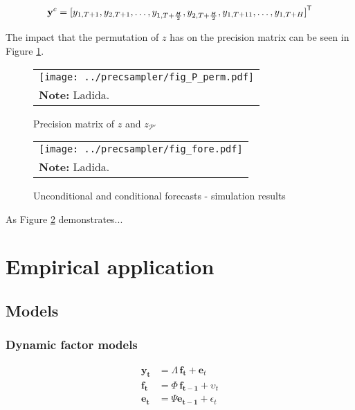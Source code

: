 \documentclass[notitlepage,a4paper,12pt]{article}
\newcommand{\transpose}[1]{{#1}^{\sf{T}}}
\begin{document}
$$\mathbf{y}^c = \transpose{[y_{1,T+1}, y_{2,T+1}, \dots, y_{1,T+\frac{H}{2}}, y_{2,T+\frac{H}{2}}, y_{1,T+11}, \dots, y_{1,T+H}]}
$$

The impact that the permutation of $z$ has on the precision matrix can be seen in Figure \ref{fig_Pperm}. 

\begin{figure}[htbp] \centering
    \caption{Precision matrix of $z$ and $z_{\mathcal{P}'}$\label{fig_Pperm}}
    \footnotesize
    \begin{tabular}{p{16cm}}
    \texttt{[image: ../precsampler/fig\_P\_perm.pdf]} \\
    \footnotesize \textbf{Note:} Ladida.
    \end{tabular}
    \newline
    \normalsize
\end{figure}

\begin{figure}[htbp] \centering
    \caption{Unconditional and conditional forecasts - simulation results\label{fig_simfore}}
    \footnotesize
    \begin{tabular}{p{16cm}}
    \texttt{[image: ../precsampler/fig\_fore.pdf]} \\
    \footnotesize \textbf{Note:} Ladida.
    \end{tabular}
    \newline
    \normalsize
\end{figure}



As Figure \ref{fig_simfore} demonstrates... 

\section{Empirical application}

\subsection{Models}

\subsubsection{Dynamic factor models}

\begin{subequations}
    \label{eqn:factormodel}
    \begin{align}
        \mathbf{y_t} &= \Lambda \, \mathbf{f_t} + \mathbf{e}_t \\
        \mathbf{f_t} &= \Phi \, \mathbf{f_{t-1}} + \upsilon_t \\
        \mathbf{e_t} &= \Psi \mathbf{e_{t-1}} + \epsilon_t 
    \end{align}
\end{subequations}
\end{document}
